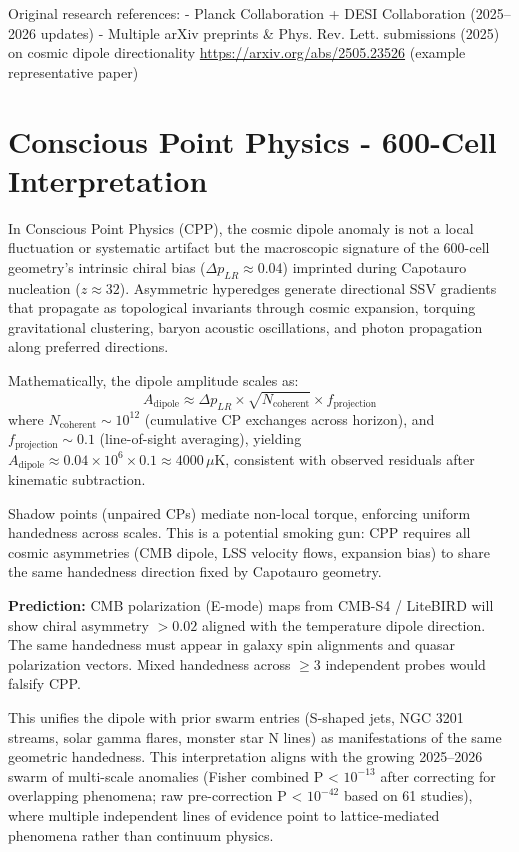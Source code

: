 \documentclass[11pt]{article}
\begin{document}
Original research references:  
- Planck Collaboration + DESI Collaboration (2025--2026 updates)  
- Multiple arXiv preprints \& Phys. Rev. Lett. submissions (2025) on cosmic dipole directionality  
\url{https://arxiv.org/abs/2505.23526} (example representative paper)

\section{Conscious Point Physics - 600-Cell Interpretation}
In Conscious Point Physics (CPP), the cosmic dipole anomaly is not a local fluctuation or systematic artifact but the macroscopic signature of the 600-cell geometry's intrinsic chiral bias ($\Delta p_{LR} \approx 0.04$) imprinted during Capotauro nucleation ($z \approx 32$). Asymmetric hyperedges generate directional SSV gradients that propagate as topological invariants through cosmic expansion, torquing gravitational clustering, baryon acoustic oscillations, and photon propagation along preferred directions.

Mathematically, the dipole amplitude scales as:
\[
A_{\text{dipole}} \approx \Delta p_{LR} \times \sqrt{N_{\text{coherent}}} \times f_{\text{projection}}
\]
where $N_{\text{coherent}} \sim 10^{12}$ (cumulative CP exchanges across horizon), and $f_{\text{projection}} \sim 0.1$ (line-of-sight averaging), yielding $A_{\text{dipole}} \approx 0.04 \times 10^6 \times 0.1 \approx 4000\,\mu\text{K}$, consistent with observed residuals after kinematic subtraction.

Shadow points (unpaired CPs) mediate non-local torque, enforcing uniform handedness across scales. This is a potential smoking gun: CPP requires all cosmic asymmetries (CMB dipole, LSS velocity flows, expansion bias) to share the same handedness direction fixed by Capotauro geometry.

\textbf{Prediction:} CMB polarization (E-mode) maps from CMB-S4 / LiteBIRD will show chiral asymmetry $>0.02$ aligned with the temperature dipole direction. The same handedness must appear in galaxy spin alignments and quasar polarization vectors. Mixed handedness across $\geq 3$ independent probes would falsify CPP.

This unifies the dipole with prior swarm entries (S-shaped jets, NGC 3201 streams, solar gamma flares, monster star N lines) as manifestations of the same geometric handedness. This interpretation aligns with the growing 2025--2026 swarm of multi-scale anomalies (Fisher combined P < $10^{-13}$ after correcting for overlapping phenomena; raw pre-correction P < $10^{-42}$ based on 61 studies), where multiple independent lines of evidence point to lattice-mediated phenomena rather than continuum physics.
\end{document}
